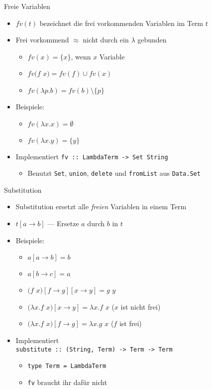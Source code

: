 \documentclass{beamer}
\begin{document}
\begin{frame}{Freie Variablen}
	\begin{itemize}
		\item $fv(t)$ bezeichnet die frei vorkommenden Variablen im Term $t$
		\item Frei vorkommend $\approx$ nicht durch ein $\lambda$ gebunden
		\begin{itemize}
			\item $fv(x) = \{x\}$, wenn $x$ Variable
			\item $fv(f$ $x) = fv(f) \cup fv(x)$
			\item $fv(\lambda{}p.b) = fv(b) \setminus \{p\}$
		\end{itemize}
		\item Beispiele:
		\begin{itemize}
			\item $fv(\lambda{}x.x) = \emptyset$
			\item $fv(\lambda{}x.y) = \{y\}$
		\end{itemize}
		\pause
		\item Implementiert \texttt{fv :: LambdaTerm -> Set String}
		\begin{itemize}
			\item Benutzt \texttt{Set}, \texttt{union}, \texttt{delete} und \texttt{fromList} aus \texttt{Data.Set}
		\end{itemize}
	\end{itemize}
\end{frame}

\begin{frame}{Substitution}
	\begin{itemize}
		\item Substitution ersetzt alle \emph{freien} Variablen in einem Term
		\item $t\left[a \to b\right]$ --- Ersetze $a$ durch $b$ in $t$
		\item Beispiele:
		\begin{itemize}
			\item $a\left[a \to b\right] = b$
			\item $a\left[b \to c\right] = a$
			\item $(f$ $x)\left[f \to g\right]\left[x \to y\right] = g$ $y$
			\pause
			\item $(\lambda{}x.f$ $x)\left[x \to y\right] = \lambda{}x.f$ $x$ ($x$ ist nicht frei)
			\item $(\lambda{}x.f$ $x)\left[f \to g\right] = \lambda{}x.g$ $x$ ($f$ ist frei)
		\end{itemize}
		\pause
		\item Implementiert\\
		      \texttt{substitute :: (String, Term) -> Term -> Term}
		\begin{itemize}
			\item \texttt{type Term = LambdaTerm}
			\item \texttt{fv} braucht ihr dafür nicht
		\end{itemize}
	\end{itemize}
\end{frame}
\end{document}
